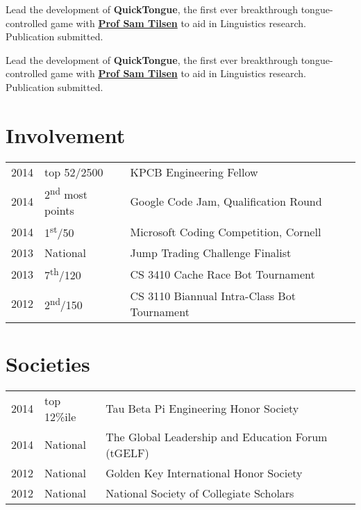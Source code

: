 \documentclass[]{deedy-resume-openfont}
\begin{document}
\begin{minipage}[t]{0.66\textwidth}
Lead the development of \textbf{QuickTongue}, the first ever breakthrough tongue-controlled game with \textbf{\href{http://conf.ling.cornell.edu/~tilsen/}{Prof Sam Tilsen}} to aid in Linguistics research. Publication submitted.
\sectionsep

Lead the development of \textbf{QuickTongue}, the first ever breakthrough tongue-controlled game with \textbf{\href{http://conf.ling.cornell.edu/~tilsen/}{Prof Sam Tilsen}} to aid in Linguistics research. Publication submitted.
\sectionsep


\section{Involvement} 
\begin{tabular}{rll}
2014	     & top 52/2500  & KPCB Engineering Fellow\\
2014	     & 2\textsuperscript{nd} most points  & Google Code Jam, Qualification Round\\
2014	     & 1\textsuperscript{st}/50  & Microsoft Coding Competition, Cornell\\
2013	     & National  & Jump Trading Challenge Finalist\\
2013     & 7\textsuperscript{th}/120 & CS 3410 Cache Race Bot Tournament  \\
2012     & 2\textsuperscript{nd}/150 & CS 3110 Biannual Intra-Class Bot Tournament \\

\end{tabular}
\sectionsep


\section{Societies} 

\begin{tabular}{rll}
2014 	& top 12\%ile    & Tau Beta Pi Engineering Honor Society\\
2014   & National   & The Global Leadership and Education Forum (tGELF)\\
2012   &  National  & Golden Key International Honor Society\\
2012   &  National   & National Society of Collegiate Scholars\\
\end{tabular}
\sectionsep

\end{minipage} 
\end{document}
